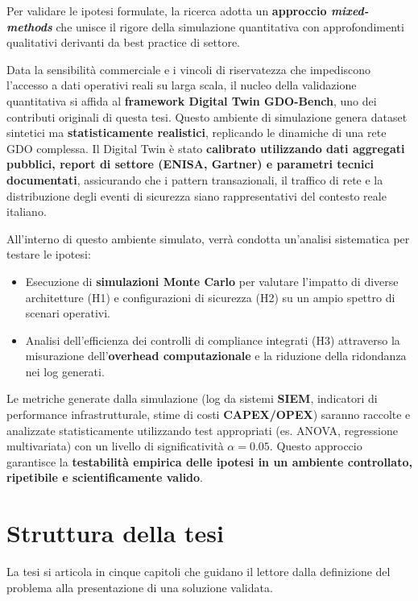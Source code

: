 Per validare le ipotesi formulate, la ricerca adotta un \textbf{approccio \textit{mixed-methods}} che unisce il rigore della simulazione quantitativa con approfondimenti qualitativi derivanti da best practice di settore.

Data la sensibilità commerciale e i vincoli di riservatezza che impediscono l'accesso a dati operativi reali su larga scala, il nucleo della validazione quantitativa si affida al \textbf{framework Digital Twin GDO-Bench}, uno dei contributi originali di questa tesi. Questo ambiente di simulazione genera dataset sintetici ma \textbf{statisticamente realistici}, replicando le dinamiche di una rete GDO complessa. Il Digital Twin è stato \textbf{calibrato utilizzando dati aggregati pubblici, report di settore (ENISA, Gartner) e parametri tecnici documentati}, assicurando che i pattern transazionali, il traffico di rete e la distribuzione degli eventi di sicurezza siano rappresentativi del contesto reale italiano.

All'interno di questo ambiente simulato, verrà condotta un'analisi sistematica per testare le ipotesi:
\begin{itemize}
    \item Esecuzione di \textbf{simulazioni Monte Carlo} per valutare l'impatto di diverse architetture (H1) e configurazioni di sicurezza (H2) su un ampio spettro di scenari operativi.
    \item Analisi dell'efficienza dei controlli di compliance integrati (H3) attraverso la misurazione dell'\textbf{overhead computazionale} e la riduzione della ridondanza nei log generati.
\end{itemize}

Le metriche generate dalla simulazione (log da sistemi \textbf{SIEM}, indicatori di performance infrastrutturale, stime di costi \textbf{CAPEX/OPEX}) saranno raccolte e analizzate statisticamente utilizzando test appropriati (es. ANOVA, regressione multivariata) con un livello di significatività $\alpha=0.05$. Questo approccio garantisce la \textbf{testabilità empirica delle ipotesi in un ambiente controllato, ripetibile e scientificamente valido}.
\section{Struttura della tesi}
La tesi si articola in cinque capitoli che guidano il lettore dalla definizione del problema alla presentazione di una soluzione validata.

